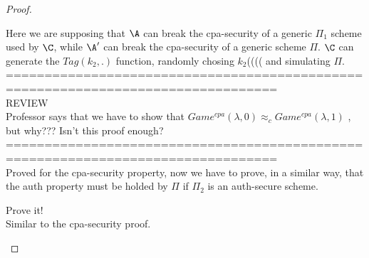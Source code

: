 \begin{proof}
\begin{figure}[h!]
\end{figure}

Here we are supposing that $\A$ can break the cpa-security of a generic $\Pi_{1}$ 
scheme used by $\C$, while $\A'$ can break the cpa-security of a generic scheme
$\Pi$. $\C$ can generate the $Tag(k_{2},.)$ function, randomly chosing
$k_{2}$((((
and simulating $\Pi$.
\\=================================================================================\\
REVIEW\\
Professor says that we have to show that $Game^{cpa}(\lambda, 0) \approx_{c}
Game^{cpa}(\lambda, 1)$ , but why??? Isn't this proof enough?
\\=================================================================================\\
Proved for the cpa-security property, now we have to prove, in a similar way,
that the auth property must be holded by $\Pi$ if $\Pi_{2}$ is an auth-secure
scheme.
\begin{exercise}
    Prove it!\\
    Similar to the cpa-security proof.
\end{exercise}





\end{proof}
